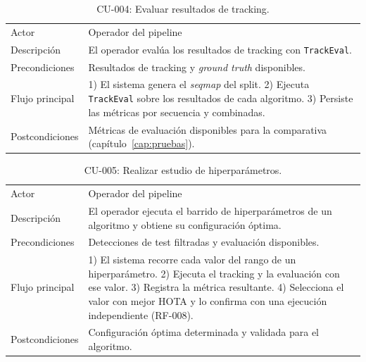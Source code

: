 \begin{table}[htp]
\centering
\caption{CU-004: Evaluar resultados de tracking.}
\label{tab:cu-004}
\renewcommand{\arraystretch}{1.2}
\begin{tabular}{|p{3.1cm}|p{9.2cm}|}
\hline
\rowcolor{gray!25}
\multicolumn{2}{|l|}{\textbf{CU-004 -- Evaluar resultados de tracking}} \\
\hline
Actor & Operador del pipeline \\
\hline
Descripción & El operador evalúa los resultados de tracking con
  \texttt{TrackEval}. \\
\hline
Precondiciones & Resultados de tracking y \emph{ground truth}
  disponibles. \\
\hline
Flujo principal & 1) El sistema genera el \emph{seqmap} del split. 2)
  Ejecuta \texttt{TrackEval} sobre los resultados de cada algoritmo. 3)
  Persiste las métricas por secuencia y combinadas. \\
\hline
Postcondiciones & Métricas de evaluación disponibles para la comparativa
  (capítulo~\ref{cap:pruebas}). \\
\hline
\end{tabular}
\end{table}

\begin{table}[htp]
\centering
\caption{CU-005: Realizar estudio de hiperparámetros.}
\label{tab:cu-005}
\renewcommand{\arraystretch}{1.2}
\begin{tabular}{|p{3.1cm}|p{9.2cm}|}
\hline
\rowcolor{gray!25}
\multicolumn{2}{|l|}{\textbf{CU-005 -- Realizar estudio de hiperparámetros}} \\
\hline
Actor & Operador del pipeline \\
\hline
Descripción & El operador ejecuta el barrido de hiperparámetros de un
  algoritmo y obtiene su configuración óptima. \\
\hline
Precondiciones & Detecciones de test filtradas y evaluación
  disponibles. \\
\hline
Flujo principal & 1) El sistema recorre cada valor del rango de un
  hiperparámetro. 2) Ejecuta el tracking y la evaluación con ese
  valor. 3) Registra la métrica resultante. 4) Selecciona el valor con
  mejor HOTA y lo confirma con una ejecución independiente (RF-008). \\
\hline
Postcondiciones & Configuración óptima determinada y validada para el
  algoritmo. \\
\hline
\end{tabular}
\end{table}


